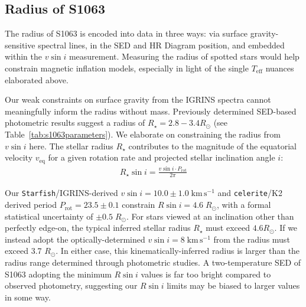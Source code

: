 \documentclass[trackchanges]{aastex631}
\begin{document}
\subsection{Radius of S1063}
\label{sec:radius}

The radius of S1063 is encoded into data in three ways: via surface gravity-sensitive spectral lines, in the SED and HR Diagram position, and embedded within the $v\sin{i}$ measurement. Measuring the radius of spotted stars would help constrain magnetic inflation models, especially in light of the single $T_{\textrm{eff}}$ nuances elaborated above.

Our weak constraints on surface gravity from the IGRINS spectra cannot meaningfully inform the radius without mass. Previously determined SED-based photometric results suggest a radius of $R_{\star} = 2.8-3.4 R_\odot$ (see Table~\ref{tab:s1063parameters}). We elaborate on constraining the radius from $v\sin{i}$ here.
The stellar radius $R_{\star}$ contributes to the magnitude of the equatorial velocity $v_{\mathrm{eq}}$ for a given rotation rate and projected stellar inclination angle $i$:
\begin{eqnarray}
  R_{\star} \sin{i} = \frac{v \sin{i} \cdot P_{\mathrm{rot}}}{2 \pi} \label{rsini}
\end{eqnarray}

Our \texttt{Starfish}/IGRINS-derived $v\sin{i}=10.0 \pm 1.0 \; \mathrm{km\,s^{-1}}$ and \texttt{celerite}/K2 derived period $P_{\mathrm{rot}}=23.5 \pm 0.1$ constrain $R\sin{i} = 4.6 \;R_\odot$, with a formal statistical uncertainty of $\pm 0.5 \;R_\odot$.  For stars viewed at an inclination other than perfectly edge-on, the typical inferred stellar radius $R_{\star}$ must exceed $4.6 R_{\odot}$. If we instead adopt the optically-determined $v\sin{i}=8\; \mathrm{km\,s^{-1}}$ from \citet{mathieu03} the radius must exceed 3.7 $R_{\odot}$. In either case, this kinematically-inferred radius is larger than the radius range determined through photometric studies. A two-temperature SED of S1063 adopting the minimum $R\sin{i}$ values is far too bright compared to observed photometry, suggesting our $R\sin{i}$ limits may be biased to larger values in some way.
\end{document}
